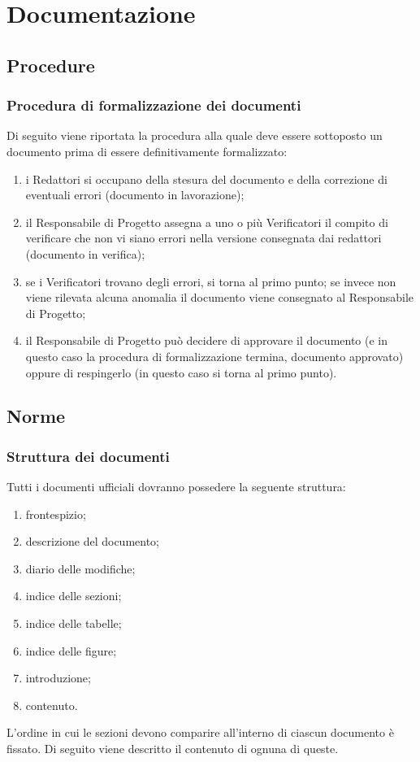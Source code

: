 \section{Documentazione}
	\subsection{Procedure}
		\subsubsection{Procedura di formalizzazione dei documenti}
			Di seguito viene riportata la procedura alla quale deve essere sottoposto un documento prima di essere definitivamente formalizzato:
			\begin{enumerate}
				\item i Redattori si occupano della stesura del documento e della correzione di eventuali errori (documento in lavorazione);
				\item il Responsabile di Progetto assegna a uno o più Verificatori il compito di verificare che non vi siano errori nella versione consegnata dai redattori (documento in verifica);
				\item se i Verificatori trovano degli errori, si torna al primo punto; se invece non viene rilevata alcuna anomalia il documento viene consegnato al Responsabile di Progetto;
				\item il Responsabile di Progetto può decidere di approvare il documento (e in questo caso la procedura di formalizzazione termina, documento approvato) oppure di respingerlo (in questo caso si torna al primo punto).
			\end{enumerate}
	\subsection{Norme}
		\subsubsection{Struttura dei documenti}
			Tutti i documenti ufficiali dovranno possedere la seguente struttura:
			\begin{enumerate}
				\item frontespizio;
				\item descrizione del documento;
				\item diario delle modifiche;
				\item indice delle sezioni;
				\item indice delle tabelle;
				\item indice delle figure;
				\item introduzione;
				\item contenuto.
			\end{enumerate}
			L’ordine in cui le sezioni devono comparire all’interno di ciascun documento è fissato. Di seguito viene descritto il contenuto di ognuna di queste.
